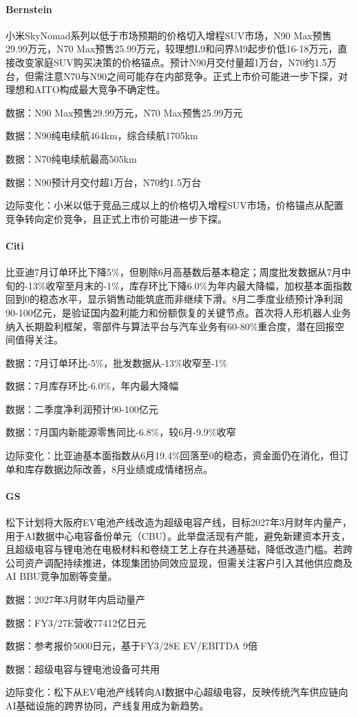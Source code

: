 \documentclass[11pt]{ctexart}
\begin{document}
\paragraph{Bernstein} 小米SkyNomad系列以低于市场预期的价格切入增程SUV市场，N90 Max预售29.99万元，N70 Max预售25.99万元，较理想L9和问界M9起步价低16-18万元，直接改变家庭SUV购买决策的价格锚点。预计N90月交付量超1万台，N70约1.5万台，但需注意N70与N90之间可能存在内部竞争。正式上市价可能进一步下探，对理想和AITO构成最大竞争不确定性。
{\small\color{refgray}数据：N90 Max预售29.99万元，N70 Max预售25.99万元\par}
{\small\color{refgray}数据：N90纯电续航464km，综合续航1705km\par}
{\small\color{refgray}数据：N70纯电续航最高505km\par}
{\small\color{refgray}数据：N90预计月交付超1万台，N70约1.5万台\par}
{\small\color{refgray}边际变化：小米以低于竞品三成以上的价格切入增程SUV市场，价格锚点从配置竞争转向定价竞争，且正式上市价可能进一步下探。\par}
\paragraph{Citi} 比亚迪7月订单环比下降5\%，但剔除6月高基数后基本稳定；周度批发数据从7月中旬的-13\%收窄至月末的-1\%，库存环比下降6.0\%为年内最大降幅，加权基本面指数回到0的稳态水平，显示销售动能筑底而非继续下滑。8月二季度业绩预计净利润90-100亿元，是验证国内盈利能力和份额恢复的关键节点。首次将人形机器人业务纳入长期盈利框架，零部件与算法平台与汽车业务有60-80\%重合度，潜在回报空间值得关注。
{\small\color{refgray}数据：7月订单环比-5\%，批发数据从-13\%收窄至-1\%\par}
{\small\color{refgray}数据：7月库存环比-6.0\%，年内最大降幅\par}
{\small\color{refgray}数据：二季度净利润预计90-100亿元\par}
{\small\color{refgray}数据：7月国内新能源零售同比-6.8\%，较6月-9.9\%收窄\par}
{\small\color{refgray}边际变化：比亚迪基本面指数从6月19.4\%回落至0的稳态，资金面仍在消化，但订单和库存数据边际改善，8月业绩或成情绪拐点。\par}
\paragraph{GS} 松下计划将大阪府EV电池产线改造为超级电容产线，目标2027年3月财年内量产，用于AI数据中心电容备份单元（CBU）。此举盘活现有产能，避免新建资本开支，且超级电容与锂电池在电极材料和卷绕工艺上存在共通基础，降低改造门槛。若跨公司资产调配持续推进，体现集团协同效应显现，但需关注客户引入其他供应商及AI BBU竞争加剧等变量。
{\small\color{refgray}数据：2027年3月财年内启动量产\par}
{\small\color{refgray}数据：FY3/27E营收77412亿日元\par}
{\small\color{refgray}数据：参考报价5000日元，基于FY3/28E EV/EBITDA 9倍\par}
{\small\color{refgray}数据：超级电容与锂电池设备可共用\par}
{\small\color{refgray}边际变化：松下从EV电池产线转向AI数据中心超级电容，反映传统汽车供应链向AI基础设施的跨界协同，产线复用成为新趋势。\par}
\end{document}
